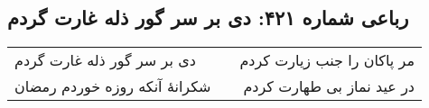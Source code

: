 \begin{center}
\section*{رباعی شماره ۴۲۱: دی بر سر گور ذله غارت گردم}
\label{sec:sh421}
\begin{longtable}{l p{0.5cm} r}
دی بر سر گور ذله غارت گردم
&&
مر پاکان را جنب زیارت کردم
\\
شکرانهٔ آنکه روزه خوردم رمضان
&&
در عید نماز بی طهارت کردم
\\
\end{longtable}
\end{center}

